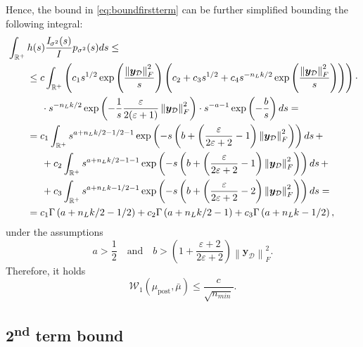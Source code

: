 \documentclass[a4paper, 11pt, reqno]{amsart}
\theoremstyle{plain}
\theoremstyle{remark}
\theoremstyle{definition}
\newcommand{\wass}[3][2]{\mathcal{W}_{#1}\left(#2, #3\right)}
\newcommand{\real}{\mathbb{R}}
\newcommand{\norm}[1]{\left\lVert#1\right\rVert}
\renewcommand{\exp}[1]{\operatorname{exp}\left(#1\right)}
\let\epsilon\varepsilon
\newcommand{\blankeq}{\kern14.65pt}
\begin{document}
Hence, the bound in \cref{eq:boundfirstterm} can be further simplified bounding the following integral:
\begin{align*}
	& \int_{\real^+} h(s) \frac{\mathit{I}_{\sigma^2}(s)}{\mathit{I}} p_{\sigma^2}(s) ds \leq \\
	& \kern20pt \begin{aligned}
		& \leq c \int_{\real^+} \left(c_1 s^{1/2} \exp{\frac{\norm{\bm{y}_{\mathcal{D}}}_F^2}{s}} \left(c_2 + c_3 s^{1/2} + c_4 s^{- n_L k / 2} \exp{\frac{\norm{\bm{y}_{\mathcal{D}}}_F^2}{s}}\right)\right) \cdot \\
		& \blankeq \cdot s^{- n_L k / 2} \exp{-\frac{1}{s} \frac{\epsilon}{2 (\epsilon + 1)} \norm{\bm{y}_{\mathcal{D}}}_F^2 } \cdot s^{- a - 1} \exp{-\frac{b}{s}} ds = \\
		& = c_1 \int_{\real^+} s^{a + n_L k / 2 - 1/2 - 1} \exp{-s \left(b + \left(\frac{\epsilon}{2\epsilon + 2} - 1\right) \norm{\bm{y}_{\mathcal{D}}}_F^2\right)} ds \, + \\
		& \blankeq + c_2 \int_{\real^+} s^{a + n_L k / 2 - 1 - 1} \exp{-s \left(b + \left(\frac{\epsilon}{2\epsilon + 2} - 1\right) \norm{\bm{y}_{\mathcal{D}}}_F^2\right)} ds \, + \\
		& \blankeq + c_3 \int_{\real^+} s^{a + n_L k - 1/2 - 1} \exp{-s \left(b + \left(\frac{\epsilon}{2\epsilon + 2} - 2\right) \norm{\bm{y}_{\mathcal{D}}}_F^2\right)} ds = \\
		& = c_1 \Gamma\left(a + n_L k / 2 - 1/2\right) + c_2 \Gamma\left(a + n_L k / 2 - 1\right) + c_3 \Gamma\left(a + n_L k - 1/2\right),
	\end{aligned}
\end{align*}
under the assumptions 
\begin{equation*}
	a > \frac{1}{2} \quad \text{and} \quad b > \left(1 + \frac{\epsilon + 2}{2\epsilon + 2}\right) \norm{\bm{y}_{\mathcal{D}}}_F^2.
\end{equation*}
Therefore, it holds
\begin{equation*}
	\wass[1]{\mu_{\mathrm{post}}}{\bar{\mu}} \leq \frac{c}{\sqrt{n_{min}}}.
\end{equation*}

\subsection{\texorpdfstring{2\textsuperscript{nd}}{Second} term bound} \label{subsec:secondterm}
\end{document}
